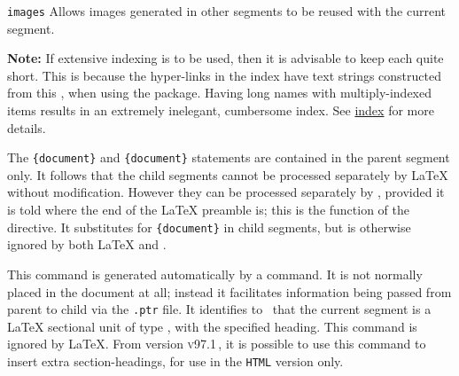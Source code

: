 \begin{htmllist}
\begin{htmllist}
\item[\texttt{images}] 
Allows images generated in other segments to be reused with the current segment.
\html{\\}%
\end{htmllist}
%
\html{\\}%
\textbf{Note: } If extensive indexing is to be used, then it is advisable
to keep each  quite short. This is because the hyper-links
in the index have text strings constructed from this ,
when using the  package. Having long names with
multiply-indexed items results in an extremely inelegant, cumbersome index.
See \hyperref{the section on indexing}{Section~}{}{index} for more details.%


%
%
\item [ \Lc{startdocument}\label{startdoc}]
%
The \verb|{document}| and  \verb|{document}|
statements are contained in the parent segment only.  
It follows that the child segments cannot be processed
separately by \LaTeX{} without modification.  However they can be
processed separately by \latextohtml, provided it is told
where the end of the \LaTeX{} preamble is;  this is
the function of the  directive.  It 
substitutes for \verb|{document}| in child segments, 
but is otherwise ignored by both \LaTeX{} and \latextohtml.

%
\item [ \Lc{htmlhead\char123}\Meta{sec-type}%
 \texttt{\char125\char123}\Meta{heading}\texttt{\char125}\label{htmlhead}] 
%
This command is generated automatically by 
a  command. 
It is not normally placed in the document at all; instead it facilitates 
information being passed from parent to child 
via the \texttt{.ptr} file.\html{\\}  
It identifies to \latextohtml\ that the current segment 
is a \LaTeX{} sectional unit of type , with the specified heading.\html{\\}
This command is ignored by \LaTeX. %
From version \textsc{v97.1}\,, it is possible to use this command to insert extra section-headings,
for use in the \texttt{HTML} version only.%


\end{htmllist}
